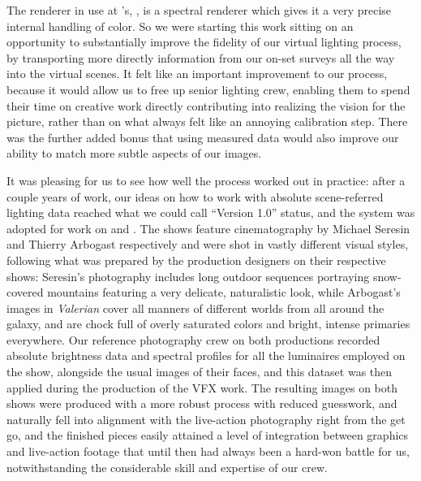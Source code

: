 The renderer in use at 's, , is a spectral renderer
which gives it a very precise internal handling of color. 
So we were starting this work sitting on an opportunity to substantially improve the fidelity of 
our \gls{virtual} lighting process, by transporting more directly information from our on-set 
surveys all the way into the \gls{virtual} scenes.
It felt like an important improvement to our process, because it would allow us to free up 
senior lighting crew, enabling them to spend their time on creative work directly contributing into
realizing the vision for the picture, rather than on what always felt like an annoying calibration step.
There was the further added bonus that using measured data would also improve our ability to match 
more subtle aspects of our images.

It was pleasing for us to see how well the process worked out in practice: 
after a couple years of work, our ideas on how to work with absolute scene-referred
lighting data reached what we could call ``Version 1.0'' status, 
and the system was adopted for work on \cite{wfpota2017} and \cite{valerian2017}. 
The shows feature cinematography by Michael Seresin and Thierry Arbogast respectively and were shot 
in vastly different visual styles, following what was prepared by the production designers
on their respective shows: Seresin's photography includes long outdoor sequences portraying 
snow-covered mountains featuring a very delicate, naturalistic look, while Arbogast's images 
in \emph{Valerian} cover all manners of different worlds from all around the galaxy, and
are chock full of overly saturated colors and bright, intense primaries everywhere.
Our reference photography crew on both productions recorded absolute brightness data and spectral profiles
for all the luminaires employed on the show, alongside the usual images of their faces, and this dataset
was then applied during the production of the \gls{VFX} work. 
The resulting images on both shows were produced with a more robust process with reduced guesswork, 
and naturally fell into alignment with the live-action photography right from the get go, 
and the finished pieces easily attained a level of integration between graphics and live-action
footage that until then had always been a hard-won battle for us, notwithstanding the considerable
skill and expertise of our crew.


